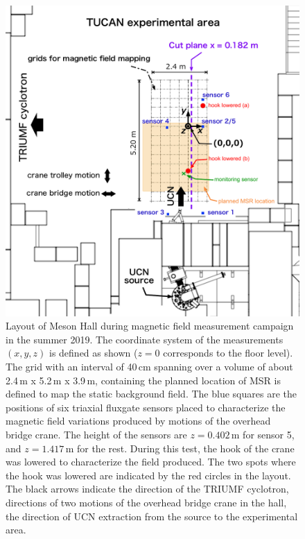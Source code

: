 \begin{figure}[htb!]
     \centering
     \includegraphics[width=.9\textwidth]{graphics/AMC/Layout_CDR.pdf}
     \caption{Layout of Meson Hall during magnetic field measurement campaign in the summer 2019. The coordinate system of the measurements $(x,y,z)$ is defined as shown ($z=0$ corresponds to the floor level).
     The grid with an interval of 40\,cm spanning over a volume of about 2.4\,m x 5.2\,m x 3.9\,m, containing the planned location of MSR is defined to map the static background field. The blue squares are the positions of six triaxial fluxgate sensors placed to characterize the magnetic field variations produced by motions of the overhead bridge crane. The height of the sensors are $z=0.402$\,m for sensor 5, and $z=1.417$\,m for the rest. During this test, the hook of the crane was lowered to characterize the field produced. The two spots where the hook was lowered are indicated by the red circles in the layout.
     The black arrows indicate the direction of the TRIUMF cyclotron, directions of  two motions of the overhead bridge crane in the hall, the direction of UCN extraction from the source to the experimental area.  }
     \label{fig:amc_layout}
 \end{figure}
 
